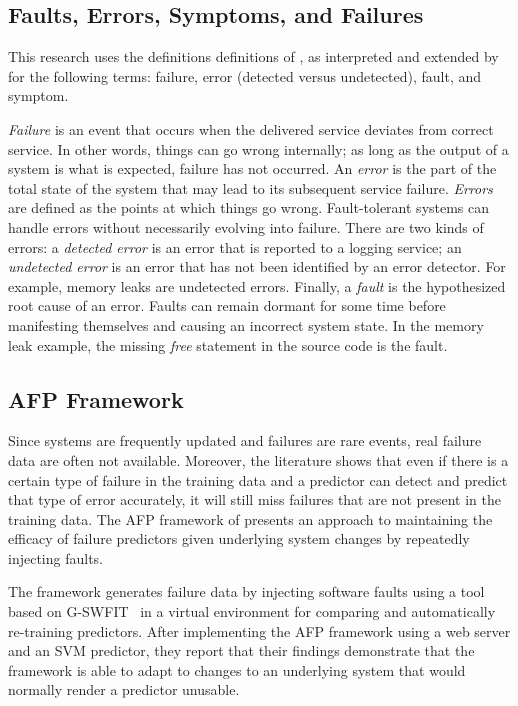 \subsection{Faults, Errors, Symptoms, and Failures}
This research uses the definitions definitions of \citet{avivzienis2004basic},
as interpreted and extended by \citet{salfnerSurvey} for the following terms:
failure, error (detected versus undetected), fault, and symptom.

\emph{Failure} is an event that occurs when the delivered service deviates from
correct service.  In other words, things can go wrong internally; as long as
the output of a system is what is expected, failure has not occurred.  An
\emph{error} is the part of the total state of the system that may lead to its
subsequent service failure.  \emph{Errors} are defined as the points at which
things go wrong.  Fault-tolerant systems can handle errors without necessarily
evolving into failure.  There are two kinds of errors: a \emph{detected error}
is an error that is reported to a logging service; an \emph{undetected error}
is an error that has not been identified by an error detector.  For example,
memory leaks are undetected errors.  Finally, a \emph{fault} is the
hypothesized root cause of an error.  Faults can remain dormant for some time
before manifesting themselves and causing an incorrect system state.  In the
memory leak example, the missing \emph{free} statement in the source code is
the fault.  

\subsection{\acrfull{AFP} Framework} \label{afp}
Since systems are frequently updated and failures are rare events, real failure
data are often not available.  Moreover, the literature shows that even if
there is a certain type of failure in the training data and a predictor can
detect and predict that type of error accurately, it will still miss failures
that are not present in the training data.  The \ac{AFP} framework of
\citet{irrera2015} presents an approach to maintaining the efficacy of failure
predictors given underlying system changes by repeatedly injecting faults.

The framework generates failure data by injecting software faults using a tool
based on \ac{G-SWFIT}~\citep{gswfit} in a virtual environment for comparing and
automatically re-training predictors.  After implementing the \ac{AFP}
framework using a web server and an \ac{SVM} predictor, they report that their
findings demonstrate that the framework is able to adapt to changes to an
underlying system that would normally render a predictor unusable.

